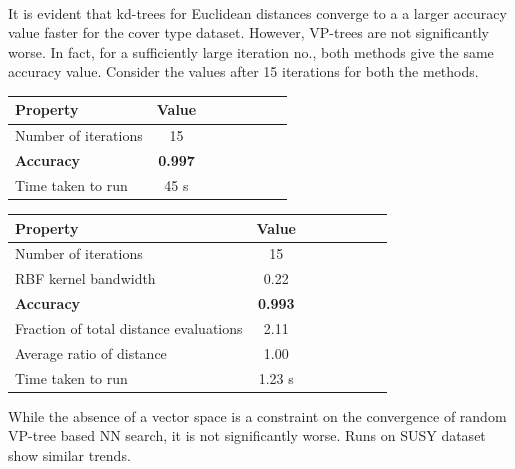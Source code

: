 \documentclass[11pt]{article}
\begin{document}
\\
It is evident that kd-trees for Euclidean distances converge to a a larger accuracy value faster for the cover type dataset. However, VP-trees are not significantly worse. In fact, for a sufficiently large iteration no., both methods give the same accuracy value. Consider the values after 15 iterations for both the methods.
\begin{center}
\begin{tabular}{l*{6}{c}r} Property & Value \\ 
\hline 
Number of iterations & 15 \\ 
\textbf{Accuracy} & \textbf{0.997} \\
Time taken to run & 45 s \\
\end{tabular}
 \label{tab:kd_covtupe}
\end{center}
\begin{center}
\begin{tabular}{l*{6}{c}r} Property & Value \\ 
\hline 
Number of iterations & 15 \\
RBF kernel bandwidth & 0.22 \\ 
\textbf{Accuracy} & \textbf{0.993} \\
Fraction of total distance evaluations & 2.11 \\
Average ratio of distance & 1.00 \\
Time taken to run & 1.23 s \\
\end{tabular}
 \label{tab:vp_covtupe}
\end{center}
While the absence of a vector space is a constraint on the convergence of random VP-tree based NN search, it is not significantly worse. Runs on SUSY dataset show similar trends. 
\end{document}

